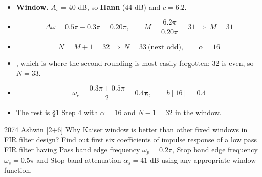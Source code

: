 \begin{itemize}
  \item \textbf{Window.} $A_s=40$ dB, so \textbf{Hann} ($44$ dB) and $c=6.2$.
  \item[] \[ \Delta\omega=0.5\pi-0.3\pi=0.20\pi,\qquad
             M=\frac{6.2\pi}{0.20\pi}=31\ \Rightarrow\ M=31 \]
  \item[] \[ N=M+1=32\ \Rightarrow\ \boxed{N=33}\ \text{(next odd)},\qquad \alpha=16 \]
  \item {}, which is where the second rounding is most
        easily forgotten: $32$ is even, so $N=33$.
  \item[] \[ \omega_c=\frac{0.3\pi+0.5\pi}{2}=\mathbf{0.4\pi},\qquad h[16]=0.4 \]
  \item The rest is \S1 Step 4 with $\alpha=16$ and $N-1=32$ in the window.
\end{itemize}

\begin{asked}{2074 Ashwin \textperiodcentered{} [2+6]}
Why Kaiser window is better than other fixed windows in FIR filter design? Find out first
six coefficients of impulse response of a low pass FIR filter having Pass band edge
frequency $\omega_p=0.2\pi$, Stop band edge frequency $\omega_s=0.5\pi$ and Stop band
attenuation $\alpha_s=41$ dB using any appropriate window function.
\end{asked}

